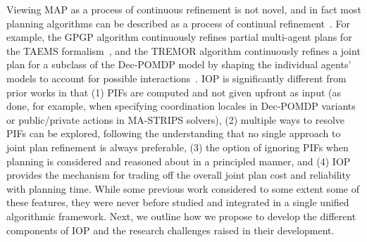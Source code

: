 \documentclass[11pt]{article}
\begin{document}
Viewing MAP as a process of continuous refinement is not novel, and in fact most planning algorithms can be described as a process of continual refinement~\cite{kambhampati1997refinement,lesser2004evolution,de2005multi,georgeff1988communication}. For example, the GPGP algorithm continuously refines partial multi-agent plans for the TAEMS formalism~\cite{lesser2004evolution}, and the TREMOR algorithm continuously refines a joint plan for a subclass of the Dec-POMDP model by shaping the individual agents' models to account for possible interactions~\cite{varakantham2009exploiting}. 
IOP is significantly different from prior works in that 
(1) PIFs are computed and not given upfront as input (as done, for example, when specifying coordination locales in Dec-POMDP variants or public/private actions in MA-STRIPS solvers),
(2) multiple ways to resolve PIFs can be explored, following the understanding that no single approach to joint plan refinement is always preferable,
(3) the option of ignoring PIFs when planning is considered and reasoned about in a principled manner, and (4) IOP provides the mechanism for trading off the overall joint plan cost and reliability with planning time. 
While some previous work considered to some extent some of these features, they were never before studied and integrated in a single unified algorithmic framework. Next, we outline how we propose to develop the different components of IOP and the research challenges raised in their development. 

\end{document}
